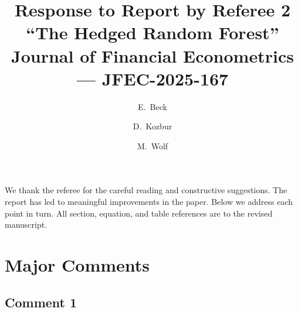 \documentclass[12pt]{article}
\title{Response to Report by Referee 2\\[6pt]
  \large ``The Hedged Random Forest''\\
  \normalsize Journal of Financial Econometrics --- JFEC-2025-167}
\author{E.\ Beck \and D.\ Kozbur \and M.\ Wolf}
\date{}
\begin{document}
\maketitle
\thispagestyle{empty}

We thank the referee for the careful reading and constructive suggestions.
The report has led to meaningful improvements in the paper.
Below we address each point in turn.
All section, equation, and table references are to the revised manuscript.

\section*{Major Comments}

\subsection*{Comment 1}
\end{document}
